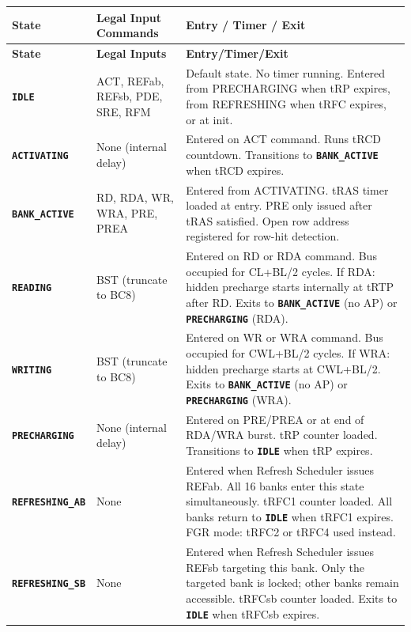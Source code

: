 \documentclass[11pt,a4paper]{article}
\newcommand{\state}[1]{\textcolor{ddrblue}{\textbf{\texttt{#1}}}}
\begin{document}
\begin{longtable}{L{3cm} L{4.2cm} L{7.3cm}}
\toprule
\textbf{State} & \textbf{Legal Input Commands} & \textbf{Entry / Timer / Exit} \\
\midrule
\endfirsthead
\toprule\textbf{State}&\textbf{Legal Inputs}&\textbf{Entry/Timer/Exit}\\\midrule\endhead
\bottomrule\endfoot

\state{IDLE}
  & ACT, REFab, REFsb, PDE, SRE, RFM
  & Default state. No timer running. Entered from PRECHARGING when tRP expires,
    from REFRESHING when tRFC expires, or at init. \\

\state{ACTIVATING}
  & None (internal delay)
  & Entered on ACT command. Runs tRCD countdown.
    Transitions to \state{BANK\_ACTIVE} when tRCD expires. \\

\state{BANK\_ACTIVE}
  & RD, RDA, WR, WRA, PRE, PREA
  & Entered from ACTIVATING. tRAS timer loaded at entry.
    PRE only issued after tRAS satisfied.
    Open row address registered for row-hit detection. \\

\state{READING}
  & BST (truncate to BC8)
  & Entered on RD or RDA command. Bus occupied for CL+BL/2 cycles.
    If RDA: hidden precharge starts internally at tRTP after RD.
    Exits to \state{BANK\_ACTIVE} (no AP) or \state{PRECHARGING} (RDA). \\

\state{WRITING}
  & BST (truncate to BC8)
  & Entered on WR or WRA command. Bus occupied for CWL+BL/2 cycles.
    If WRA: hidden precharge starts at CWL+BL/2.
    Exits to \state{BANK\_ACTIVE} (no AP) or \state{PRECHARGING} (WRA). \\

\state{PRECHARGING}
  & None (internal delay)
  & Entered on PRE/PREA or at end of RDA/WRA burst. tRP counter loaded.
    Transitions to \state{IDLE} when tRP expires. \\

\state{REFRESHING\_AB}
  & None
  & Entered when Refresh Scheduler issues REFab. All 16 banks enter this state
    simultaneously. tRFC1 counter loaded. All banks return to \state{IDLE}
    when tRFC1 expires. FGR mode: tRFC2 or tRFC4 used instead. \\

\state{REFRESHING\_SB}
  & None
  & Entered when Refresh Scheduler issues REFsb targeting this bank.
    Only the targeted bank is locked; other banks remain accessible.
    tRFCsb counter loaded. Exits to \state{IDLE} when tRFCsb expires. \\


\end{longtable}
\end{document}
